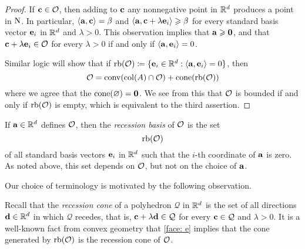 \documentclass[11pt]{amsart}
\begin{document}
\begin{proof}  If $\mathbf{c} \in \mathcal{O}$, then adding to $\mathbf{c}$ any nonnegative point in $\mathbb{R}^d$ produces a point in $\mathrm{N}$.  In particular, $\langle \mathbf{a}, \mathbf{c} \rangle = \beta$ and $\langle \mathbf{a}, \mathbf{c} + \lambda \mathbf{e}_i \rangle \geqslant \beta$ for every standard basis vector $\mathbf{e}_i$ in $\mathbb{R}^d$ and $\lambda > 0$.  This observation implies that $\mathbf{a} \geqslant \mathbf{0}$, and that $\mathbf{c} + \lambda \mathbf{e}_i \in \mathcal{O}$ for every $\lambda > 0$ if and only if $\langle \mathbf{a}, \mathbf{e}_i \rangle = 0$.  

Similar logic will show that if $\operatorname{rb}(\mathcal{O}) \coloneqq  \{ \mathbf{e}_i \in \mathbb{R}^d : \langle \mathbf{a}, \mathbf{e}_i \rangle = 0\}$, then 
\begin{equation}
\label{face: e}
\mathcal{O} =  \operatorname{conv}( \operatorname{col}(A) \cap \mathcal{O} ) + \operatorname{cone}(\operatorname{rb}(\mathcal{O}))
\end{equation}
where we agree that the $\operatorname{cone}(\varnothing) = \mathbf{0}$.  We see from this that $\mathcal{O}$ is bounded if and only if $\operatorname{rb}(\mathcal{O})$ is empty, which is equivalent to the third assertion.  
\end{proof}

\begin{definition} If $\mathbf{a} \in \mathbb{R}^d$ defines $\mathcal{O}$, then the \emph{recession basis} of $\mathcal{O}$ is the set \[ \operatorname{rb}(\mathcal{O}) \] of all standard basis vectors $\mathbf{e}_i$ in $\mathbb{R}^d$ such that the $i$-th coordinate of $\mathbf{a}$ is zero.  As noted above, this set depends on $\mathcal{O}$, but not on the choice of $\mathbf{a}$.
\end{definition}


Our choice of terminology is motivated by the following observation.

\begin{remark}  Recall that the \emph{recession cone} of a polyhedron $\mathcal{Q}$ in $\mathbb{R}^d$ is the set of all directions $\mathbf{d} \in \mathbb{R}^d$ in which $\mathcal{Q}$ recedes, that is, $\mathbf{c} + \lambda \mathbf{d} \in \mathcal{Q}$ for every $\mathbf{c} \in \mathcal{Q}$ and $\lambda > 0$.  It is a well-known fact from convex geometry that  \eqref{face: e} implies that the cone generated by $\operatorname{rb}(\mathcal{O})$ is the recession cone of $\mathcal{O}$.
\end{remark}
\end{document}
